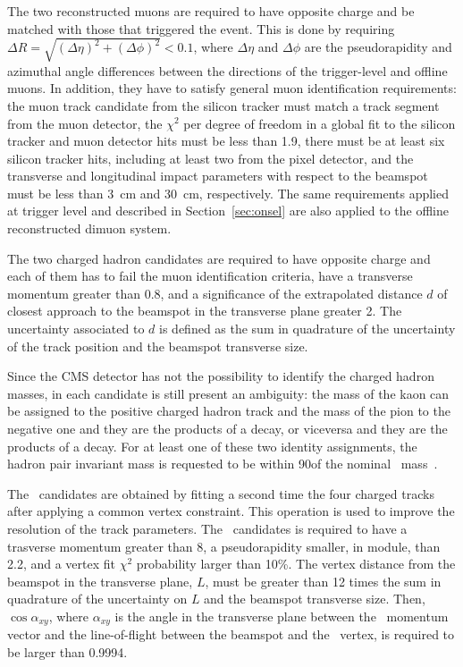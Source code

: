 The two reconstructed muons are required to have opposite charge and be matched with those that triggered the event. This is done by requiring $\Delta R = \sqrt{(\Delta\eta)^2+(\Delta\phi)^2}<0.1$, where $\Delta\eta$ and $\Delta\phi$ are the pseudorapidity and azimuthal angle differences between the directions of the trigger-level and offline muons.
In addition, they have to satisfy general muon identification requirements: the muon track candidate from the silicon  tracker must match a track segment from the muon detector, the $\chi^2$ per degree of freedom in a global fit to the silicon tracker and muon detector hits must be less than 1.9, there must be at least six silicon tracker hits, including at least two from the pixel detector, and the transverse and longitudinal impact parameters with respect to the beamspot must be less than \SI{3}{\centi\metre} and \SI{30}{\centi\metre}, respectively.
The same requirements applied at trigger level and described in Section~\ref{sec:onsel} are also applied to the offline reconstructed dimuon system.

The two charged hadron candidates are required to have opposite charge and each of them has to fail the muon identification criteria, have a transverse momentum greater than 0.8\GeV, and a significance of the extrapolated distance $d$ of closest approach to the beamspot in the transverse plane greater 2. The uncertainty associated to $d$ is defined as the sum in quadrature of the uncertainty of the track position and the beamspot transverse size.

Since the CMS detector has not the possibility to identify the charged hadron masses, in each candidate is still present an ambiguity: the mass of the kaon can be assigned to the positive charged hadron track and the mass of the pion to the negative one and they are the products of a \cPKstz decay, or viceversa and they are the products of a \cPAKstz decay.
For at least one of these two identity assignments, the hadron pair invariant mass is requested to be within 90\MeV of the nominal \cPKstz\ mass~\cite{PDG}.

The \PBz\ candidates are obtained by fitting a second time the four charged tracks after applying a common vertex constraint. This operation is used to improve the resolution of the track parameters.
The \PBz\ candidates is required to have a trasverse momentum greater than 8\GeV, a pseudorapidity smaller, in module, than 2.2, and a vertex fit $\chi^2$ probability larger than 10\%.
The vertex distance from the beamspot in the transverse plane, $L$, must be greater than 12 times the sum in quadrature of the uncertainty on $L$ and the beamspot transverse size. Then, $\cos{\alpha_{xy}}$, where $\alpha_{xy}$ is the angle in the transverse plane between the \PBz\ momentum vector and the line-of-flight between the beamspot and the \PBz\ vertex, is required to be larger than 0.9994.

